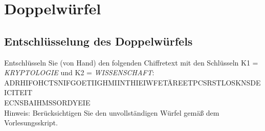 
\section{Doppelwürfel}
 \subsection{Entschlüsselung des Doppelwürfels}
 Entschlüsseln Sie (von Hand) den folgenden Chiffretext mit den Schlüsseln K1 = \textit{KRYPTOLOGIE} und K2 = \textit{WISSENSCHAFT}:\\
 ADRHIFOHCTSNIFGOETIIGHMIINTHIEIWFETÄREETPCSRSTLOSKNSDEICITEIT\\
 ECNSBAIHMSSORDYEIE\\
 Hinweis: Berücksichtigen Sie den unvollständigen Würfel gemäß dem Vorlesungsskript.\\\\
